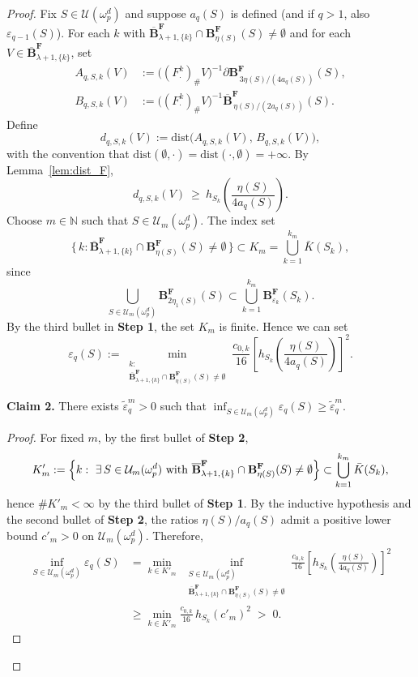 \documentclass[10pt,a4paper]{amsart}
\begin{document}
\begin{proof}
Fix $S\in\mathcal{U}(\omega^d_p)$ and suppose $a_q(S)$ is defined (and if $q>1$, also $\varepsilon_{q-1}(S)$). For each \(k\) with \(\overline{\mathbf{B}}^{\mathbf F}_{\lambda+1,\{k\}}\cap \mathbf{B}^{\mathbf F}_{\eta(S)}(S)\neq\emptyset\) and for each \(V\in\overline{\mathbf{B}}^{\mathbf F}_{\lambda+1,\{k\}}\), set
\[
\begin{aligned}
A_{q,S,k}(V)&:=\bigl((F^k_{\cdot})_{\#}V\bigr)^{-1}\partial\mathbf{B}^{\mathbf F}_{\,3\eta(S)/(4a_q(S))}(S),\\
B_{q,S,k}(V)&:=\bigl((F^k_{\cdot})_{\#}V\bigr)^{-1}\overline{\mathbf{B}}^{\mathbf F}_{\,\eta(S)/(2a_q(S))}(S).
\end{aligned}
\]
Define
\[
d_{q,S,k}(V):=\mathrm{dist}\bigl(A_{q,S,k}(V),\,B_{q,S,k}(V)\bigr),
\]
with the convention that \(\mathrm{dist}(\emptyset,\cdot)=\mathrm{dist}(\cdot,\emptyset)=+\infty\). By Lemma~\ref{lem:dist_F},
\[
    d_{q,S,k}(V)\ \ge\ h_{S_k}\!\left(\frac{\eta(S)}{4a_q(S)}\right).
\]
Choose $m \in \mathbb{N}$ such that $S \in \mathcal{U}_m(\omega^d_p)$. The index set
\[
    \{\,k : \overline{\mathbf{B}}^\mathbf{F}_{\lambda+1,\{k\}}\cap \mathbf{B}^\mathbf{F}_{\eta(S)}(S)\neq\emptyset\,\}
    \subset K_m=\bigcup_{k=1}^{k_m}\bar K(S_k),
\]
since
\[\displaystyle \bigcup_{S\in\mathcal{U}_m(\omega^d_p)}\mathbf{B}^\mathbf{F}_{2\eta_1(S)}(S)\subset \bigcup_{k=1}^{k_m}\mathbf{B}^\mathbf{F}_{\varepsilon_k}(S_k).\]
By the third bullet in \textbf{Step 1}, the set \(K_m\) is finite. Hence we can set
\begin{equation}\label{eq:def-eps}
    \varepsilon_q(S):=\min_{\substack{k:\\ \overline{\mathbf{B}}^{\mathbf F}_{\lambda+1,\{k\}}\cap \mathbf{B}^{\mathbf F}_{\eta(S)}(S)\neq\emptyset}}
    \frac{c_{0,k}}{16}\left[h_{S_k}\!\left(\frac{\eta(S)}{4a_q(S)}\right)\right]^2.
\end{equation}

\textbf{Claim 2.} There exists $\tilde\varepsilon^m_q>0$ such that $\inf_{S\in\mathcal{U}_m(\omega^d_p)}\varepsilon_q(S)\ge \tilde\varepsilon^m_q$.
\begin{proof}
For fixed $m$, by the first bullet of \textbf{Step 2},
\[
K'_m:=\Bigl\{k:\ \exists\,S\in\mathcal{U}_m(\omega^d_p)\ \text{with}\ \overline{\mathbf{B}}^{\mathbf F}_{\lambda+1,\{k\}}\cap \mathbf{B}^{\mathbf F}_{\eta(S)}(S)\neq\emptyset\Bigr\}
\subset \bigcup_{k=1}^{k_m}\bar K(S_k),
\]
hence $\#K'_m<\infty$ by the third bullet of \textbf{Step 1}. By the inductive hypothesis and the second bullet of \textbf{Step 2}, the ratios $\eta(S)/a_q(S)$ admit a positive lower bound $c'_m>0$ on $\mathcal{U}_m(\omega^d_p)$. Therefore,
\[
\begin{aligned}
\inf_{S\in\mathcal{U}_m(\omega^d_p)}\varepsilon_q(S)
&= \min_{k\in K'_m}\ 
\inf_{\substack{S\in\mathcal{U}_m(\omega^d_p)\\
\overline{\mathbf{B}}^{\mathbf F}_{\lambda+1,\{k\}}
\cap \mathbf{B}^{\mathbf F}_{\eta(S)}(S)\neq\emptyset}}
\frac{c_{0,k}}{16}\left[h_{S_k}\!\left(\frac{\eta(S)}{4a_q(S)}\right)\right]^2 \\
&\ge \min_{k\in K'_m}\frac{c_{0,k}}{16}\,h_{S_k}(c'_m)^2 \;>\; 0.
\end{aligned}
\]
\end{proof}


\end{proof}
\end{document}
